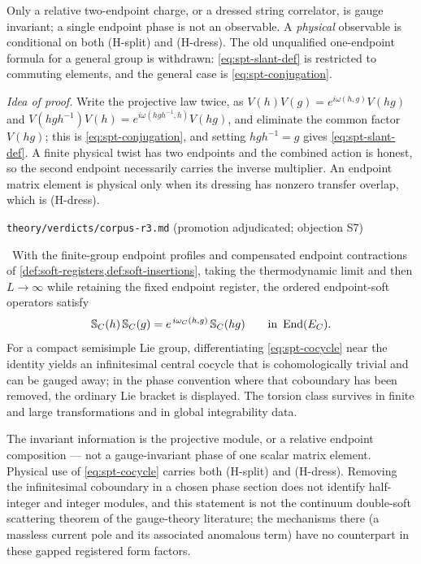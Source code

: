 \begin{scope}
Only a relative two-endpoint charge, or a dressed string correlator, is gauge
invariant; a single endpoint phase is not an observable. A \emph{physical}
observable is conditional on both (H-split) and (H-dress). The old
unqualified one-endpoint formula for a general group is withdrawn:
\eqref{eq:spt-slant-def} is restricted to commuting elements, and the general
case is \eqref{eq:spt-conjugation}.
\end{scope}

\emph{Idea of proof.} Write the projective law twice, as
$V(h)V(g)=e^{i\omega(h,g)}V(hg)$ and
$V(hgh^{-1})V(h)=e^{i\omega(hgh^{-1},h)}V(hg)$, and eliminate the common
factor $V(hg)$; this is \eqref{eq:spt-conjugation}, and setting $hgh^{-1}=g$
gives \eqref{eq:spt-slant-def}. A finite physical twist has two endpoints and
the combined action is honest, so the second endpoint necessarily carries the
inverse multiplier. An endpoint matrix element is physical only when its
dressing has nonzero transfer overlap, which is (H-dress).

%
{\texttt{theory/verdicts/corpus-r3.md} (promotion adjudicated; objection S7)}

\begin{theorem}\label{thm:cocycle-realisation}
\statusProved\ With the finite-group endpoint profiles and compensated
endpoint contractions of \cref{def:soft-registers,def:soft-insertions}, taking
the thermodynamic limit and then $L\to\infty$ while retaining the fixed
endpoint register, the ordered endpoint-soft operators satisfy
\begin{equation}
  \mathbb{S}_C(h)\,\mathbb{S}_C(g)=e^{\,i\omega_C(h,g)}\,\mathbb{S}_C(hg)
  \qquad\text{in }\operatorname{End}(E_C).
  \label{eq:spt-cocycle}
\end{equation}
For a compact semisimple Lie group, differentiating \eqref{eq:spt-cocycle}
near the identity yields an infinitesimal central cocycle that is
cohomologically trivial and can be gauged away; in the phase convention where
that coboundary has been removed, the ordinary Lie bracket is displayed. The
torsion class survives in finite and large transformations and in global
integrability data.
\end{theorem}

\begin{scope}
The invariant information is the projective module, or a relative endpoint
composition --- not a gauge-invariant phase of one scalar matrix element.
Physical use of \eqref{eq:spt-cocycle} carries both (H-split) and (H-dress).
Removing the infinitesimal coboundary in a chosen phase section does not
identify half-integer and integer modules, and this statement is not the
continuum double-soft scattering theorem of the gauge-theory literature; the
mechanisms there (a massless current pole and its associated anomalous term)
have no counterpart in these gapped registered form factors.
\end{scope}


